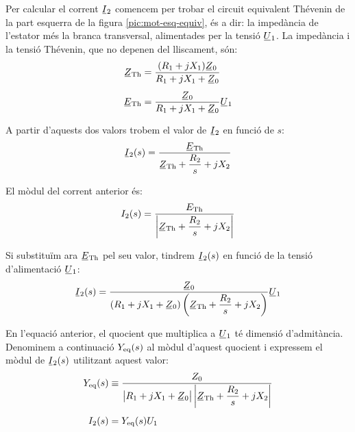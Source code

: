 Per calcular el corrent $\cmplx{I}_2$ comencem per trobar el circuit equivalent Thévenin de la part esquerra de la figura \vref{pic:mot-esq-equiv}, és a dir: la impedància de l'estator més la branca transversal, alimentades per la tensió $\cmplx{U}_1$. La impedància i la tensió Thévenin, que no depenen del lliscament, són:
\begin{subequations}
\begin{align}
    \cmplx{Z}\ped{Th} &= \frac{(R_1 + j X_1) \cmplx{Z}_0}{R_1 + j X_1 + \cmplx{Z}_0} \label{eq:mot-ZTh} \\[1ex]
    \cmplx{E}\ped{Th} &= \frac{\cmplx{Z}_0}{R_1 + j X_1 + \cmplx{Z}_0} \cmplx{U}_1 \label{eq:mot-ETh}
\end{align}
\end{subequations}

A partir d'aquests dos valors trobem el valor de $\cmplx{I}_2$ en funció de $s$:
\begin{equation}
    \cmplx{I}_2(s) = \frac{\cmplx{E}\ped{Th}}{\cmplx{Z}\ped{Th} + \dfrac{R_2}{s} + j X_2}
\end{equation}

El mòdul del corrent anterior és:
\begin{equation}
    I_2(s) = \frac{E\ped{Th}}{\left|\cmplx{Z}\ped{Th} + \dfrac{R_2}{s} + j X_2\right|} \label{eq-mot-I2}
\end{equation}

Si substituïm  ara $\cmplx{E}\ped{Th}$ pel seu valor, tindrem $\cmplx{I}_2(s)$ en funció de la tensió d'alimentació $\cmplx{U}_1$:
\begin{equation}
    \cmplx{I}_2(s) = \frac{\cmplx{Z}_0}{(R_1 + j X_1 + \cmplx{Z}_0)\left(\cmplx{Z}\ped{Th} + \dfrac{R_2}{s} + j X_2\right)} \cmplx{U}_1\label{eq:mot-I2}
\end{equation}

En l'equació anterior, el quocient que multiplica a $\cmplx{U}_1$ té dimensió d'admitància. Denominem a continuació $Y_\mathrm{eq}(s)$ al mòdul d'aquest quocient i expressem el mòdul de $\cmplx{I}_2(s)$ utilitzant aquest valor:
\begin{subequations}
\begin{align}
    Y\ped{eq}(s) &\equiv \frac{Z_0}{\big|R_1 + j X_1 + \cmplx{Z}_0\big| \left|\cmplx{Z}\ped{Th} + \dfrac{R_2}{s} + j X_2\right|}\label{eq:mot-Yeq}  \\[1ex]
    I_2(s) &= Y\ped{eq}(s) U_1
\end{align}
\end{subequations}

